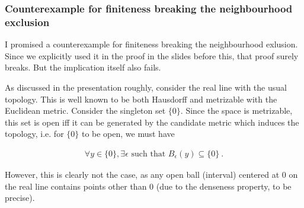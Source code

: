 \begin{frame}
    \frametitle{Counterexample for finiteness breaking the neighbourhood exclusion}

    I promised a counterexample for finiteness breaking the neighbourhood
    exlusion. Since we explicitly used it in the proof in the slides before
    this, that proof surely breaks. But the implication itself also fails.

    As discussed in the presentation roughly, consider the real line with the
    usual topology. This is well known to be both Hausdorff and metrizable with
    the Euclidean metric. Consider the singleton set \(\{0\}\). Since the space
    is metrizable, this set is open iff it can be generated by the candidate
    metric which induces the topology, i.e. for \(\{0\}\) to be open, we must have

    \begin{gather*}
        \forall y \in \{0\}, \exists \epsilon \text{ such that } B_\epsilon(y) \subseteq \{0\}~.
    \end{gather*}

    However, this is clearly not the case, as any open ball (interval) centered
    at 0 on the real line contains points other than 0 (due to the denseness
    property, to be precise).

\end{frame}
